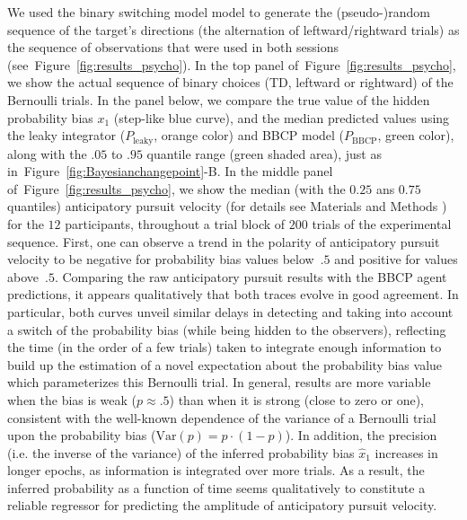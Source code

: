 \documentclass[10pt,letterpaper]{article}
\newcommand{\seeFig}[1]{Figure~\ref{fig:#1}}
\newcommand{\seeSec}[1]{Section~\ref{sec:#1}}
\begin{document}
We used the binary switching model model to generate the (pseudo-)random sequence of
the target's directions (the alternation of leftward/rightward trials)
as the sequence of observations that were used in both sessions
(see~\seeFig{results_psycho}).
In the top panel  of~\seeFig{results_psycho}, we show the actual sequence of binary choices
(TD, leftward or rightward) of the Bernoulli trials.
In the panel below, we compare %
the true value of the hidden probability bias $x_1$ (step-like blue curve),
and the median predicted values using the leaky integrator ($P_{\text{leaky}}$, orange color) and BBCP model ($P_{\text{BBCP}}$, green color),
along with the $.05$ to $.95$ quantile range (green shaded area),
just as in~\seeFig{Bayesianchangepoint}-B.
In the middle panel of~\seeFig{results_psycho}, we show the median (with the $0.25$ ans $0.75$ quantiles) anticipatory pursuit velocity (for details see Materials and Methods
 )
for the $12$ participants, throughout a trial block of $200$ trials of the experimental sequence.
First, one can observe a trend in the polarity of anticipatory pursuit velocity
to be negative for probability bias values below~$.5$ and positive for values above~$.5$.
Comparing the raw anticipatory pursuit results with the BBCP agent predictions,
it appears qualitatively that both traces evolve in good agreement.
In particular, both curves unveil similar delays in detecting and
taking into account a switch of the probability bias (while being hidden to the observers),
reflecting the time (in the order of a few trials) taken to integrate enough information
to build up the estimation of a novel expectation about the probability bias value
which parameterizes this Bernoulli trial.
In general, results are more variable when the bias is weak ($p\approx .5$)
than when it is strong (close to zero or one),
consistent with the well-known dependence of the variance of a Bernoulli trial
upon the probability bias ($\textrm{Var}(p)= p \cdot (1-p)$).
In addition, the precision (i.e. the inverse of the variance)
of the inferred probability bias $\hat{x}_1$ increases
in longer epochs, as information is integrated over more trials.
As a result, the inferred probability as a function of time
seems qualitatively to constitute a reliable regressor
for predicting the amplitude of anticipatory pursuit velocity.
\end{document}
